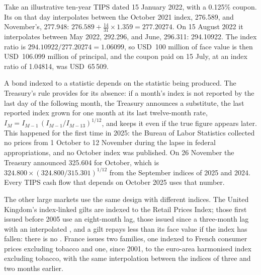 \begin{example}\label{ex:m2:inflation-markets:ratio}
Take an illustrative ten-year TIPS dated 15 January 2022, with a
0.125\% coupon. Its  on that day
interpolates between the October 2021 index, 276.589, and November's, 277.948:
$276.589 + \tfrac{14}{31}\times 1.359 = 277.20274$. On 15 August 2022 it
interpolates between May 2022, 292.296, and June, 296.311: 294.10922. The index
ratio is $294.10922/277.20274 = 1.06099$, so USD~100 million of face value is
then USD~106.099 million of principal, and the coupon paid on 15 July, at an
index ratio of 1.04814, was USD~65\,509.
\end{example}

\begin{remark}\label{rem:m2:inflation-markets:contingency}
A bond indexed to a statistic depends on the statistic being produced. The
Treasury's rule provides for its absence: if a month's index is not reported by
the last day of the following month, the Treasury announces a substitute, the
last reported index grown for one month at its last twelve-month rate,
$I_M = I_{M-1}\,(I_{M-1}/I_{M-13})^{1/12}$, and keeps it even if the true
figure appears later. This happened for the first time in 2025: the Bureau of
Labor Statistics collected no prices from 1 October to 12 November during the
lapse in federal appropriations, and no October index was published. On 26
November the Treasury announced 325.604 for October, which is
$324.800 \times (324.800/315.301)^{1/12}$ from the September indices of 2025
and 2024. Every TIPS cash flow that depends on October 2025 uses that number.
\end{remark}

The other large markets use the same design with different indices. The
United Kingdom's index-linked gilts are indexed to the Retail Prices Index;
those first issued before 2005 use an eight-month lag, those issued since a
three-month lag with an interpolated , and a gilt repays less
than its face value if the index has fallen: there is no .
France issues two families, one indexed to French consumer prices excluding
tobacco and one, since 2001, to the euro-area harmonised index excluding
tobacco, with the same interpolation between the indices of three and two
months earlier.

